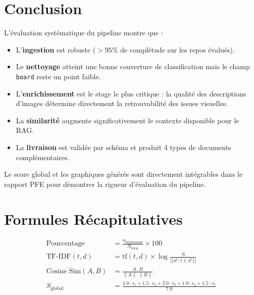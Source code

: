 \documentclass[a4paper,12pt]{article}
\begin{document}
\section{Conclusion}

L'évaluation systématique du pipeline montre que :

\begin{itemize}
    \item L'\textbf{ingestion} est robuste ($>95\%$ de complétude sur les repos évalués).
    \item Le \textbf{nettoyage} atteint une bonne couverture de classification mais le champ \texttt{board} reste un point faible.
    \item L'\textbf{enrichissement} est le stage le plus critique : la qualité des descriptions d'images détermine directement la retrouvabilité des issues visuelles.
    \item La \textbf{similarité} augmente significativement le contexte disponible pour le RAG.
    \item La \textbf{livraison} est validée par schéma et produit 4 types de documents complémentaires.
\end{itemize}

Le score global et les graphiques générés sont directement intégrables dans le rapport PFE pour démontrer la rigueur d'évaluation du pipeline.

\appendix
\section{Formules Récapitulatives}

\begin{align}
\text{Pourcentage} &= \frac{n_{\text{satisfaisant}}}{N_{\text{total}}} \times 100 \label{eq:pct} \\[10pt]
\text{TF-IDF}(t,d) &= \text{tf}(t,d) \times \log\frac{N}{|\{d' : t \in d'\}|} \label{eq:tfidf_app} \\[10pt]
\text{Cosine Sim}(A,B) &= \frac{A \cdot B}{\|A\| \cdot \|B\|} \label{eq:cosine_app} \\[10pt]
S_{\text{global}} &= \frac{1.0 \cdot s_1 + 1.5 \cdot s_2 + 2.0 \cdot s_3 + 1.0 \cdot s_4 + 1.5 \cdot s_5}{7.0} \label{eq:global_app}
\end{align}
\end{document}
